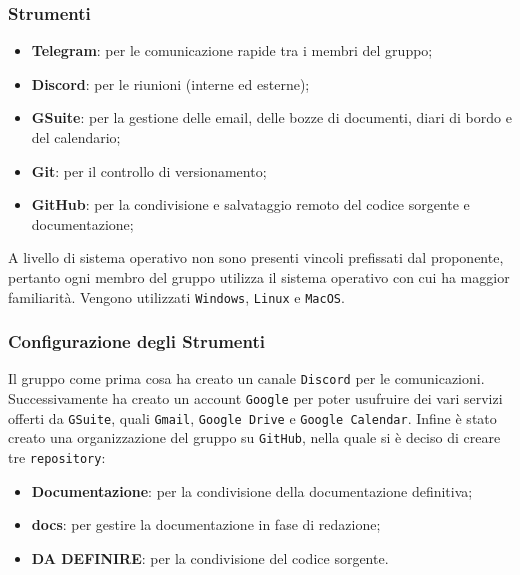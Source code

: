         \subsubsection{Strumenti}
            \begin{itemize}
                \item \textbf{Telegram}: per le comunicazione rapide tra i membri del gruppo;
                \item \textbf{Discord}: per le riunioni (interne ed esterne);
                \item \textbf{GSuite}: per la gestione delle email, delle bozze di documenti, diari di bordo e del calendario;
                \item \textbf{Git}: per il controllo di versionamento;
                \item \textbf{GitHub}: per la condivisione e salvataggio remoto del codice sorgente e documentazione;
            \end{itemize}
            
            A livello di sistema operativo non sono presenti vincoli prefissati dal proponente, pertanto ogni membro del gruppo utilizza il sistema operativo con cui ha maggior familiarità.
            Vengono utilizzati \texttt{Windows}, \texttt{Linux} e \texttt{MacOS}.

        \subsubsection{Configurazione degli Strumenti}
            Il gruppo come prima cosa ha creato un canale \texttt{Discord} per le comunicazioni.
            Successivamente ha creato un account \texttt{Google} per poter usufruire dei vari servizi offerti da \texttt{GSuite}, quali \texttt{Gmail}, \texttt{Google Drive} e \texttt{Google Calendar}.
            Infine è stato creato una organizzazione del gruppo su \texttt{GitHub}, nella quale si è deciso di creare tre \texttt{repository}:
                \begin{itemize}
                    \item \textbf{Documentazione}: per la condivisione della documentazione definitiva;
                    \item \textbf{docs}: per gestire la documentazione in fase di redazione;
                    \item \textbf{DA DEFINIRE}: per la condivisione del codice sorgente.
                \end{itemize}


